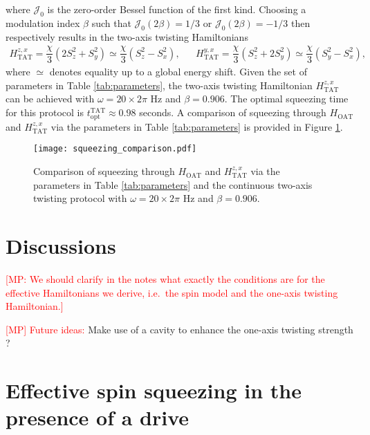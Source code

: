 \documentclass[aps,notitlepage,nofootinbib,11pt]{revtex4-1}
\renewcommand{\t}{\text} %
\newcommand{\f}[2]{\dfrac{#1}{#2}} %
\newcommand{\p}[1]{\left(#1\right)} %
\newcommand{\J}{\mathcal{J}}
\newcommand{\1}{\hat{\mathds{1}}}
\newcommand{\note}[1]{\textcolor{red}{#1}}
\begin{document}
where $\J_0$ is the zero-order Bessel function of the first kind.
Choosing a modulation index $\beta$ such that $\J_0\p{2\beta}=1/3$ or
$\J_0\p{2\beta}=-1/3$ then respectively results in the two-axis
twisting Hamiltonians
\begin{align}
  H_{\t{TAT}}^{z,x}
  = \f{\chi}{3} \p{2 S_z^2 + S_y^2}
  \simeq \f{\chi}{3} \p{S_z^2 - S_x^2},
  &&
  H_{\t{TAT}}^{y,x}
  = \f{\chi}{3} \p{S_z^2 + 2 S_y^2}
  \simeq \f{\chi}{3}\p{S_y^2 - S_x^2},
  \label{eq:H_TAT_drive}
\end{align}
where $\simeq$ denotes equality up to a global energy shift. Given the
set of parameters in Table \ref{tab:parameters}, the two-axis twisting
Hamiltonian $H_{\t{TAT}}^{z,x}$ can be achieved with
$\omega=20\times2\pi$ Hz and $\beta=0.906$.  The optimal squeezing
time for this protocol is $t_{\t{opt}}^{\t{TAT}}\approx0.98$ seconds.
A comparison of squeezing through $H_{\t{OAT}}$ and
$H_{\t{TAT}}^{z,x}$ via the parameters in Table \ref{tab:parameters}
is provided in Figure \ref{fig:squeezing_comparison}.

\begin{figure}[h]
  \centering
  \texttt{[image: squeezing\_comparison.pdf]}
  \caption{Comparison of squeezing through $H_{\t{OAT}}$ and
    $H_{\t{TAT}}^{z,x}$ via the parameters in Table
    \ref{tab:parameters} and the continuous two-axis twisting protocol
    with $\omega=20\times2\pi$ Hz and $\beta=0.906$.}
  \label{fig:squeezing_comparison}
\end{figure}


\section{Discussions}

\note{[MP: We should clarify in the notes what exactly the conditions
  are for the effective Hamiltonians we derive, i.e.~the spin model
  and the one-axis twisting Hamiltonian.]}

\note{[MP] Future ideas:} Make use of a cavity to enhance the one-axis
twisting strength \cite{hu2017vacuum}?


\appendix

\section{Effective spin squeezing in the presence of a drive}
\label{sec:effective_squeezing_drive}
\end{document}
